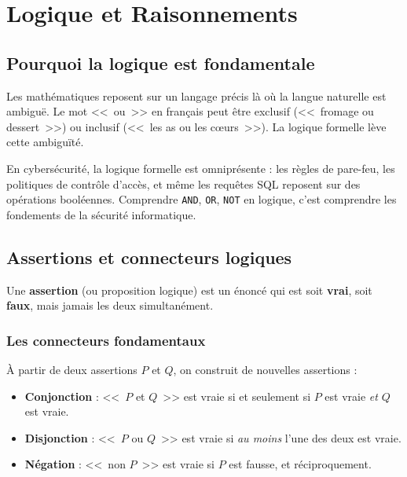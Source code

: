 \chapter{Logique et Raisonnements}

\section{Pourquoi la logique est fondamentale}

Les mathématiques reposent sur un langage précis là où la langue naturelle est ambiguë. Le mot <<~ou~>> en français peut être exclusif (<<~fromage ou dessert~>>) ou inclusif (<<~les as ou les c\oe urs~>>). La logique formelle lève cette ambiguïté.

\begin{intuitionbox}
En cybersécurité, la logique formelle est omniprésente : les règles de pare-feu, les politiques de contrôle d'accès, et même les requêtes SQL reposent sur des opérations booléennes. Comprendre \texttt{AND}, \texttt{OR}, \texttt{NOT} en logique, c'est comprendre les fondements de la sécurité informatique.
\end{intuitionbox}

\section{Assertions et connecteurs logiques}

\begin{defbox}[--- Assertion]
Une \textbf{assertion} (ou proposition logique) est un énoncé qui est soit \textbf{vrai}, soit \textbf{faux}, mais jamais les deux simultanément.
\end{defbox}

\subsection{Les connecteurs fondamentaux}

À partir de deux assertions $P$ et $Q$, on construit de nouvelles assertions :

\begin{defbox}
\begin{itemize}[leftmargin=1.5cm]
  \item \textbf{Conjonction} : <<~$P$ et $Q$~>> est vraie si et seulement si $P$ est vraie \emph{et} $Q$ est vraie.
  \item \textbf{Disjonction} : <<~$P$ ou $Q$~>> est vraie si \emph{au moins} l'une des deux est vraie.
  \item \textbf{Négation} : <<~non $P$~>> est vraie si $P$ est fausse, et réciproquement.
\end{itemize}
\end{defbox}

